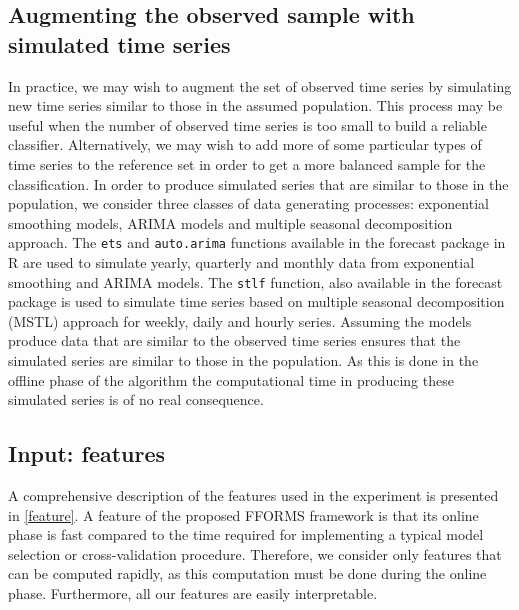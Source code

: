 \documentclass[11pt,a4paper,]{article}
\begin{document}
\hypertarget{simulatingseries}{%
\subsection{Augmenting the observed sample with simulated time series}\label{simulatingseries}}

In practice, we may wish to augment the set of observed time series by simulating new time series similar to those in the assumed population. This process may be useful when the number of observed time series is too small to build a reliable classifier. Alternatively, we may wish to add more of some particular types of time series to the reference set in order to get a more balanced sample for the classification. In order to produce simulated series that are similar to those in the population, we consider three classes of data generating processes: exponential smoothing models, ARIMA models and multiple seasonal decomposition approach. The \texttt{ets} and \texttt{auto.arima} functions available in the forecast package in R \autocite{forecast} are used to simulate yearly, quarterly and monthly data from exponential smoothing and ARIMA models. The \texttt{stlf} function, also available in the forecast package is used to simulate time series based on multiple seasonal decomposition (MSTL) approach for weekly, daily and hourly series. Assuming the models produce data that are similar to the observed time series ensures that the simulated series are similar to those in the population. As this is done in the offline phase of the algorithm the computational time in producing these simulated series is of no real consequence.

\hypertarget{input-features}{%
\subsection{Input: features}\label{input-features}}

A comprehensive description of the features used in the experiment is presented in \autoref{feature}. A feature of the proposed FFORMS framework is that its online phase is fast compared to the time required for implementing a typical model selection or cross-validation procedure. Therefore, we consider only features that can be computed rapidly, as this computation must be done during the online phase. Furthermore, all our features are easily interpretable.
\end{document}
